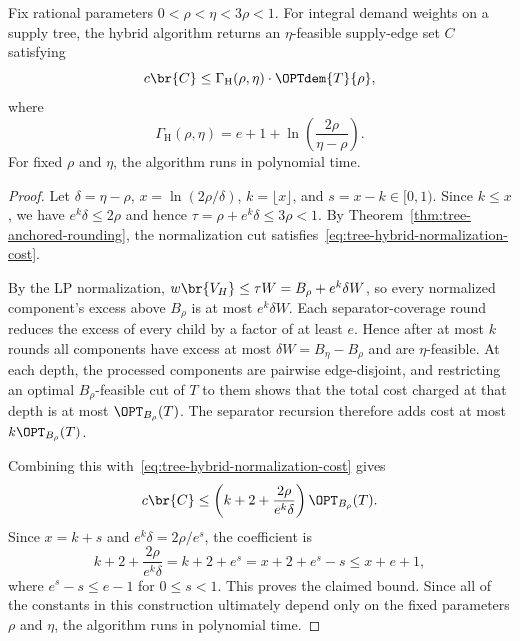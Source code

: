 \begin{theorem}\label{thm:tree-hybrid-recursion}
    Fix rational parameters $0<\rho<\eta<3\rho<1$. For integral demand weights on a supply tree, the hybrid algorithm returns an $\eta$-feasible supply-edge set $C$ satisfying
    \[
        c\br{C}\leq\Gamma_{\mathrm{H}}(\rho,\eta)\cdot\OPTdem{T}{\rho},
    \]
    where
    \begin{equation}\label{eq:tree-hybrid-ratio}
        \Gamma_{\mathrm{H}}(\rho,\eta)
        =e+1+\ln\left(\frac{2\rho}{\eta-\rho}\right).
    \end{equation}
    For fixed $\rho$ and $\eta$, the algorithm runs in polynomial time.
\end{theorem}
\begin{proof}
    Let $\delta=\eta-\rho$, $x=\ln(2\rho/\delta)$, $k=\lfloor x\rfloor$, and $s=x-k\in[0,1)$. Since $k\leq x$, we have $e^k\delta\leq2\rho$ and hence $\tau=\rho+e^k\delta\leq3\rho<1$. By Theorem~\ref{thm:tree-anchored-rounding}, the normalization cut satisfies~\eqref{eq:tree-hybrid-normalization-cost}.

    By the LP normalization, $w\br{V_H}\leq\tau W=B_\rho+e^k\delta W$, so every normalized component's excess above $B_\rho$ is at most $e^k\delta W$. Each separator-coverage round reduces the excess of every child by a factor of at least $e$. Hence after at most $k$ rounds all components have excess at most $\delta W=B_\eta-B_\rho$ and are $\eta$-feasible. At each depth, the processed components are pairwise edge-disjoint, and restricting an optimal $B_\rho$-feasible cut of $T$ to them shows that the total cost charged at that depth is at most $\OPT_{B_\rho}(T)$. The separator recursion therefore adds cost at most $k\OPT_{B_\rho}(T)$.

    Combining this with~\eqref{eq:tree-hybrid-normalization-cost} gives
    \[
        c\br{C}\leq
        \left(k+2+\frac{2\rho}{e^k\delta}\right)\OPT_{B_\rho}(T).
    \]
    Since $x=k+s$ and $e^k\delta=2\rho/e^s$, the coefficient is
    \[
        k+2+\frac{2\rho}{e^k\delta}
        =k+2+e^s
        =x+2+e^s-s
        \leq x+e+1,
    \]
    where $e^s-s\leq e-1$ for $0\leq s<1$. This proves the claimed bound. Since all of the constants in this construction ultimately depend only on the fixed parameters $\rho$ and $\eta$, the algorithm runs in polynomial time.
\end{proof}